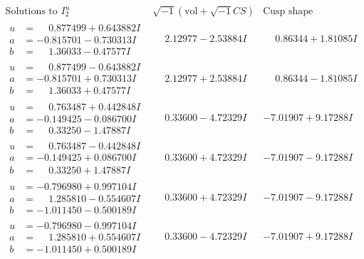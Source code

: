 \documentclass[1p]{elsarticle_modified}
\theoremstyle{definition}
\newcommand{\I}{\sqrt{-1}}
\begin{document}
$$\begin{array}{c|c|c}  
\text{Solutions to }I^u_{2}& \I (\text{vol} + \sqrt{-1}CS) & \text{Cusp shape}\\
 \hline 
\begin{aligned}
u &= \phantom{-}0.877499 + 0.643882 I \\
a &= -0.815701 - 0.730313 I \\
b &= \phantom{-}1.36033 - 0.47577 I\end{aligned}
 & \phantom{-}2.12977 - 2.53884 I & \phantom{-}0.86344 + 1.81085 I \\ \hline\begin{aligned}
u &= \phantom{-}0.877499 - 0.643882 I \\
a &= -0.815701 + 0.730313 I \\
b &= \phantom{-}1.36033 + 0.47577 I\end{aligned}
 & \phantom{-}2.12977 + 2.53884 I & \phantom{-}0.86344 - 1.81085 I \\ \hline\begin{aligned}
u &= \phantom{-}0.763487 + 0.442848 I \\
a &= -0.149425 - 0.086700 I \\
b &= \phantom{-}0.33250 - 1.47887 I\end{aligned}
 & \phantom{-}0.33600 - 4.72329 I & -7.01907 + 9.17288 I \\ \hline\begin{aligned}
u &= \phantom{-}0.763487 - 0.442848 I \\
a &= -0.149425 + 0.086700 I \\
b &= \phantom{-}0.33250 + 1.47887 I\end{aligned}
 & \phantom{-}0.33600 + 4.72329 I & -7.01907 - 9.17288 I \\ \hline\begin{aligned}
u &= -0.796980 + 0.997104 I \\
a &= \phantom{-}1.285810 - 0.554607 I \\
b &= -1.011450 - 0.500189 I\end{aligned}
 & \phantom{-}0.33600 + 4.72329 I & -7.01907 - 9.17288 I \\ \hline\begin{aligned}
u &= -0.796980 - 0.997104 I \\
a &= \phantom{-}1.285810 + 0.554607 I \\
b &= -1.011450 + 0.500189 I\end{aligned}
 & \phantom{-}0.33600 - 4.72329 I & -7.01907 + 9.17288 I \\ \hline\begin{aligned}

\end{aligned}
\end{array}$$
\end{document}
